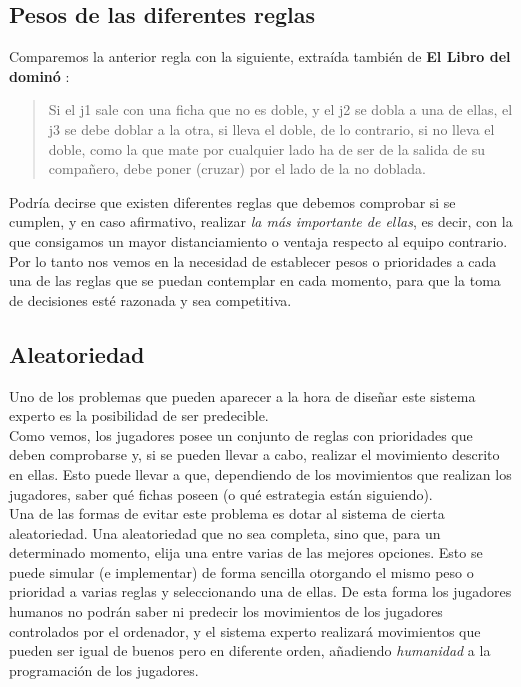 \subsection{Pesos de las diferentes reglas}

Comparemos la anterior regla con la siguiente, extraída también de \textbf{El Libro del dominó} \cite{mora90}:

\begin{quote}
    Si el j1 sale con una ficha que no es doble, y el j2 se dobla a una de ellas, el j3 se debe doblar a la otra, si
    lleva el doble, de lo contrario, si no lleva el doble, como la que mate por cualquier lado ha de ser de la
    salida de su compañero, debe poner (cruzar) por el lado de la no doblada.
\end{quote}

Podría decirse que existen diferentes reglas que debemos comprobar si se cumplen, y en caso afirmativo, realizar \emph{la
más importante de ellas}, es decir, con la que consigamos un mayor distanciamiento o ventaja respecto al equipo contrario. \\

Por lo tanto nos vemos en la necesidad de establecer pesos o prioridades a cada una de las reglas que se puedan contemplar
en cada momento, para que la toma de decisiones esté razonada y sea competitiva.

\subsection{Aleatoriedad}

Uno de los problemas que pueden aparecer a la hora de diseñar este sistema experto es la posibilidad de ser predecible. \\

Como vemos, los jugadores posee un conjunto de reglas con prioridades que deben comprobarse y, si se pueden llevar a cabo,
realizar el movimiento descrito en ellas. Esto puede llevar a que, dependiendo de los movimientos que realizan los jugadores,
saber qué fichas poseen (o qué estrategia están siguiendo). \\

Una de las formas de evitar este problema es dotar al sistema de cierta aleatoriedad. Una aleatoriedad que no sea completa,
sino que, para un determinado momento, elija una entre varias de las mejores opciones. Esto se puede simular (e implementar) de forma
sencilla otorgando el mismo peso o prioridad a varias reglas y seleccionando una de ellas. De esta forma los jugadores
humanos no podrán saber ni predecir los movimientos de los jugadores controlados por el ordenador, y el sistema experto
realizará movimientos que pueden ser igual de buenos pero en diferente orden, añadiendo \emph{humanidad} a la programación
de los jugadores.

